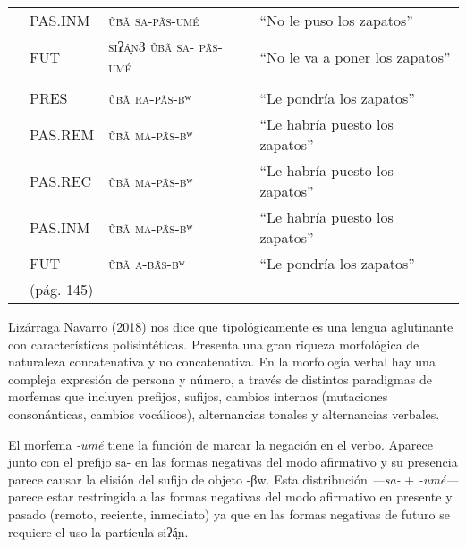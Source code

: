 {\begin{tabular}{rlrr}
                                 & PAS.INM    & \multicolumn{1}{l}{\textsc{ṹβ̃ã sa-pã́s-umé}}         & \multicolumn{1}{l}{“No le puso los zapatos”}       \\
                                 & FUT        & \multicolumn{1}{l}{\textsc{siʔá̤n3 ṹβ̃ã sa- pã́s-umé}} & \multicolumn{1}{l}{“No le va a poner los zapatos”} \\
                                 &            &                                                     &                                                    \\
                                 & PRES       & \multicolumn{1}{l}{\textsc{ṹβ̃ã ra-pã́s-βʷ}}          & \multicolumn{1}{l}{“Le pondría los zapatos”}       \\
                                 & PAS.REM    & \multicolumn{1}{l}{\textsc{ṹβ̃ã ma-pã́s-βʷ}}          & \multicolumn{1}{l}{“Le habría puesto los zapatos”} \\
                                 & PAS.REC    & \multicolumn{1}{l}{\textsc{ṹβ̃ã ma-pã́s-βʷ}}          & \multicolumn{1}{l}{“Le habría puesto los zapatos”} \\
                                 & PAS.INM    & \multicolumn{1}{l}{\textsc{ṹβ̃ã ma-pã́s-βʷ}}          & \multicolumn{1}{l}{“Le habría puesto los zapatos”} \\
                                 & FUT        & \multicolumn{1}{l}{\textsc{ṹβ̃ã a-βã́s-βʷ}}           & \multicolumn{1}{l}{“Le pondría los zapatos”}       \\
                                 & (pág. 145) &                                                     &                                                    \\
    \end{tabular}
} \vspace{0.25cm}

Lizárraga Navarro (2018) nos dice que tipológicamente es una lengua aglutinante con características polisintéticas. Presenta una gran riqueza morfológica de naturaleza concatenativa y no concatenativa. En la morfología verbal hay una compleja expresión de persona y número, a través de distintos paradigmas de morfemas que incluyen prefijos, sufijos, cambios internos (mutaciones consonánticas, cambios vocálicos), alternancias tonales y alternancias verbales.

El morfema \textit{-umé} tiene la función de marcar la negación en el verbo. Aparece junto con el prefijo sa- en las formas negativas del modo afirmativo y su presencia parece causar la elisión del sufijo de objeto {\setmainfont{Doulos SIL}-βw}. Esta distribución \textit{—sa-} + \textit{-umé—} parece estar restringida a las formas negativas del modo afirmativo en presente y pasado (remoto, reciente, inmediato) ya que en las formas negativas de futuro se requiere el uso la partícula {\setmainfont{Doulos SIL}siʔá̤n.}
